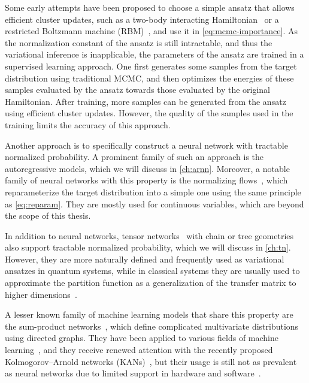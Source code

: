 Some early attempts have been proposed to choose a simple ansatz that allows efficient cluster updates, such as a two-body interacting Hamiltonian~\cite{liu2017self} or a restricted Boltzmann machine (RBM)~\cite{huang2017accelerated}, and use it in \cref{eq:mcmc-importance}. As the normalization constant of the ansatz is still intractable, and thus the variational inference is inapplicable, the parameters of the ansatz are trained in a supervised learning approach. One first generates some samples from the target distribution using traditional MCMC, and then optimizes the energies of these samples evaluated by the ansatz towards those evaluated by the original Hamiltonian. After training, more samples can be generated from the ansatz using efficient cluster updates. However, the quality of the samples used in the training limits the accuracy of this approach.

Another approach is to specifically construct a neural network with tractable normalized probability. A prominent family of such an approach is the autoregressive models, which we will discuss in \cref{ch:arnn}. Moreover, a notable family of neural networks with this property is the normalizing flows~\cite{song2017nice, muller2019neural}, which reparameterize the target distribution into a simple one using the same principle as \cref{eq:reparam}. They are mostly used for continuous variables, which are beyond the scope of this thesis.

In addition to neural networks, tensor networks~\cite{bridgeman2017hand} with chain or tree geometries also support tractable normalized probability, which we will discuss in \cref{ch:tn}. However, they are more naturally defined and frequently used as variational ansatzes in quantum systems, while in classical systems they are usually used to approximate the partition function as a generalization of the transfer matrix to higher dimensions~\cite{verstraete2006criticality, vanderstraeten2018residual, vanhecke2021solving, lanthier2024tensor}.

A lesser known family of machine learning models that share this property are the sum-product networks~\cite{poon2011sum}, which define complicated multivariate distributions using directed graphs. They have been applied to various fields of machine learning~\cite{sanchez2022sum}, and they receive renewed attention with the recently proposed Kolmogorov--Arnold networks (KANs)~\cite{liu2024kan}, but their usage is still not as prevalent as neural networks due to limited support in hardware and software~\cite{barham2019machine}.
